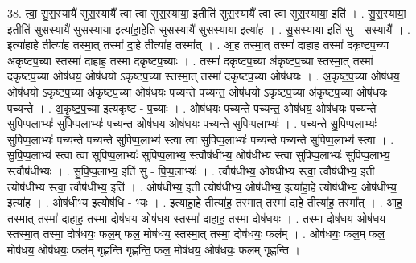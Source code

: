 \documentclass[17pt]{extarticle}
\begin{document}
38. त्वा॒ सु॒स॒स्यायै॑ सुस॒स्यायै᳚ त्वा त्वा सुस॒स्याया॒ इतीति॑ सुस॒स्यायै᳚ त्वा त्वा सुस॒स्याया॒ इति॑ । . सु॒स॒स्याया॒ इतीति॑ सुस॒स्यायै॑ सुस॒स्याया॒ इत्या॑हा॒हेति॑ सुस॒स्यायै॑ सुस॒स्याया॒ इत्या॑ह । . सु॒स॒स्याया॒ इति॑ सु - स॒स्यायै᳚ । . इत्या॑हा॒हे तीत्या॑ह॒ तस्मा॒त् तस्मा॑ दा॒हे तीत्या॑ह॒ तस्मा᳚त् । . आ॒ह॒ तस्मा॒त् तस्मा॑ दाहाह॒ तस्मा॑ दकृष्टप॒च्या अ॑कृष्टप॒च्या स्तस्मा॑ दाहाह॒ तस्मा॑ दकृष्टप॒च्याः । . तस्मा॑ दकृष्टप॒च्या अ॑कृष्टप॒च्या स्तस्मा॒त् तस्मा॑ दकृष्टप॒च्या ओष॑धय॒ ओष॑धयो ऽकृष्टप॒च्या स्तस्मा॒त् तस्मा॑ दकृष्टप॒च्या ओष॑धयः । . अ॒कृ॒ष्ट॒प॒च्या ओष॑धय॒ ओष॑धयो ऽकृष्टप॒च्या अ॑कृष्टप॒च्या ओष॑धयः पच्यन्ते पच्यन्त॒ ओष॑धयो ऽकृष्टप॒च्या अ॑कृष्टप॒च्या ओष॑धयः पच्यन्ते । . अ॒कृ॒ष्ट॒प॒च्या इत्य॑कृष्ट - प॒च्याः । . ओष॑धयः पच्यन्ते पच्यन्त॒ ओष॑धय॒ ओष॑धयः पच्यन्ते सुपिप्प॒लाभ्यः॑ सुपिप्प॒लाभ्यः॑ पच्यन्त॒ ओष॑धय॒ ओष॑धयः पच्यन्ते सुपिप्प॒लाभ्यः॑ । . प॒च्य॒न्ते॒ सु॒पि॒प्प॒लाभ्यः॑ सुपिप्प॒लाभ्यः॑ पच्यन्ते पच्यन्ते सुपिप्प॒लाभ्य॑ स्त्वा त्वा सुपिप्प॒लाभ्यः॑ पच्यन्ते पच्यन्ते सुपिप्प॒लाभ्य॑ स्त्वा । . सु॒पि॒प्प॒लाभ्य॑ स्त्वा त्वा सुपिप्प॒लाभ्यः॑ सुपिप्प॒लाभ्य॒ स्त्वौष॑धीभ्य॒ ओष॑धीभ्य स्त्वा सुपिप्प॒लाभ्यः॑ सुपिप्प॒लाभ्य॒ स्त्वौष॑धीभ्यः । . सु॒पि॒प्प॒लाभ्य॒ इति॑ सु - पि॒प्प॒लाभ्यः॑ । . त्वौष॑धीभ्य॒ ओष॑धीभ्य स्त्वा॒ त्वौष॑धीभ्य॒ इती त्योष॑धीभ्य स्त्वा॒ त्वौष॑धीभ्य॒ इति॑ । . ओष॑धीभ्य॒ इती त्योष॑धीभ्य॒ ओष॑धीभ्य॒ इत्या॑हा॒हे त्योष॑धीभ्य॒ ओष॑धीभ्य॒ इत्या॑ह । . ओष॑धीभ्य॒ इत्योष॑धि - भ्यः॒ । . इत्या॑हा॒हे तीत्या॑ह॒ तस्मा॒त् तस्मा॑ दा॒हे तीत्या॑ह॒ तस्मा᳚त् । . आ॒ह॒ तस्मा॒त् तस्मा॑ दाहाह॒ तस्मा॒ दोष॑धय॒ ओष॑धय॒ स्तस्मा॑ दाहाह॒ तस्मा॒ दोष॑धयः । . तस्मा॒ दोष॑धय॒ ओष॑धय॒ स्तस्मा॒त् तस्मा॒ दोष॑धयः॒ फल॒म् फल॒ मोष॑धय॒ स्तस्मा॒त् तस्मा॒ दोष॑धयः॒ फल᳚म् । . ओष॑धयः॒ फल॒म् फल॒ मोष॑धय॒ ओष॑धयः॒ फल॑म् गृह्णन्ति गृह्णन्ति॒ फल॒ मोष॑धय॒ ओष॑धयः॒ फल॑म् गृह्णन्ति । \newline
\end{document}

